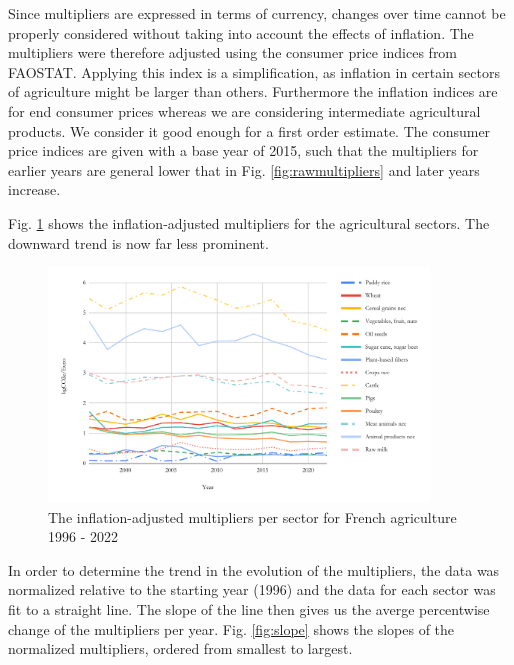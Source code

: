 \documentclass[a4paper,twoside]{article}
\begin{document}
Since multipliers are expressed in terms of currency, changes over time cannot be properly considered without taking into account the effects of inflation. The multipliers were therefore adjusted using the consumer price indices from FAOSTAT. Applying this index is a simplification, as inflation in certain sectors of agriculture might be larger than others. Furthermore the inflation indices are for end consumer prices whereas we are considering intermediate agricultural products. We consider it good enough for a first order estimate. The consumer price indices are given with a base year of 2015, such that the multipliers for earlier years are general lower that in Fig. \ref{fig:rawmultipliers} and later years increase.

Fig. \ref{fig:adjustedmultipliers} shows the inflation-adjusted multipliers for the agricultural sectors. The downward trend is now far less prominent. 

\begin{figure}[H]
\centering
\includegraphics[width=0.9\textwidth]{inflated_adjusted}
\caption{The inflation-adjusted multipliers per sector for French agriculture 1996 - 2022}\label{fig:adjustedmultipliers} 
\end{figure}

In order to determine the trend in the evolution of the multipliers, the data was normalized relative to the starting year (1996) and the data for each sector was fit to a straight line. The slope of the line then gives us the averge percentwise change of the multipliers per year. Fig. \ref{fig:slope} shows the slopes of the normalized multipliers, ordered from smallest to largest. 
\end{document}
